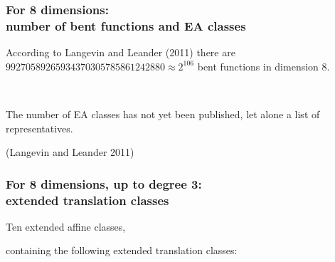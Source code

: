 \documentclass[pdf,sprung,slideColor,nocolorBG]{beamer}
\newenvironment{colortheme}[1]{
\def\ProvidesPackageRCS $##1${\relax}
\renewcommand{\ProcessOptions}{\relax}
\makeatletter

\makeatother
}{}
\newcommand{\slidecite}[1]{\tiny{(#1)}\normalsize{}}
\begin{document}
\begin{colortheme}{seagull}

\begin{frame}
\frametitle{For 8 dimensions: \\ number of bent functions and EA classes}

According to Langevin and Leander (2011)
there are $99270589265934370305785861242880 \approx 2^{106}$ bent functions in dimension 8.

~

The number of EA classes has not yet been published, let alone a list of representatives.

\slidecite{Langevin and Leander 2011}
\end{frame}

\begin{frame}
\frametitle{For 8 dimensions, up to degree 3: \\ extended translation classes}

Ten extended affine classes,

containing the following extended translation classes:


\end{frame}
\end{colortheme}
\end{document}
